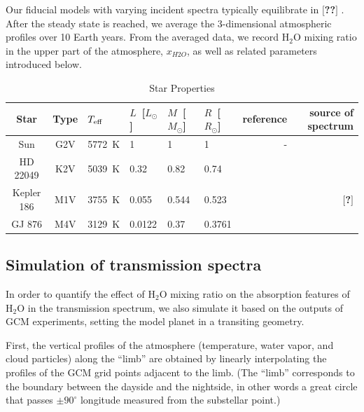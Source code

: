 \documentclass[11pt,numberedappendix,twocolappendix,]{emulateapj}
\def\water{H$_2$O }
\def\memo#1{\color{red}$[${\bf #1}$]$ \color{black}}
\begin{document}
Our fiducial models with varying incident spectra typically equilibrate in \memo{??}. 
After the steady state is reached, we average the 3-dimensional atmospheric profiles over 10 Earth years. 
From the averaged data, we record \water mixing ratio in the upper part of the atmosphere, $x_{H2O}$, as well as related parameters introduced below. 


\begin{table}[htp]
\caption{Star Properties}
\begin{center}
\begin{tabular}{ccllllrr} \hline \hline
%
Star & Type & $T_{\rm eff}$ & $L$~[$L_{\odot}$] & $M$~[$M_{\odot}$] & $R$~[$R_{\odot}$] & reference & source of spectrum \\ \hline
%
Sun & G2V & 5772~K & 1 & 1 & 1 & - & \citet{Kurucz1995} \\ 
%
HD 22049 & K2V & 5039~K & 0.32 & 0.82 & 0.74 & \citet{Baines2012} & \citet{Segura2003} \\
%
Kepler 186 & M1V & 3755~K & 0.055 & 0.544 & 0.523 & \citet{Torres2015} & \memo{?} \\
%
GJ 876 & M4V & 3129~K & 0.0122 & 0.37 & 0.3761 & \citet{vonBraun2014} & \citet{Domagal-Goldman2014} \\ \hline
\end{tabular}
\end{center}
\label{default}
\end{table}%


\subsection{Simulation of transmission spectra}

In order to quantify the effect of \water mixing ratio on the absorption features of \water in the transmission spectrum, 
we also simulate it based on the outputs of GCM experiments, setting the model planet in a transiting geometry. 

First, the vertical profiles of the atmosphere (temperature, water vapor, and cloud particles) along the ``limb'' are obtained by linearly interpolating the profiles of the GCM grid points adjacent to the limb. 
(The ``limb'' corresponds to the boundary between the dayside and the nightside, in other words a great circle that passes $\pm 90^{\circ} $ longitude measured from the substellar point.)
\end{document}
